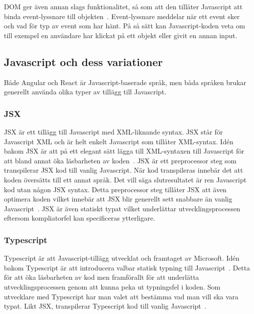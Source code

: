 DOM ger även annan slags funktionalitet, så som att den tillåter Javascript att binda event-lyssnare till objekten~\cite{w3-event}. Event-lyssnare meddelar när ett event sker och vad för typ av event som har hänt. På så sätt kan Javascript-koden veta om till exempel en användare har klickat på ett objekt eller givit en annan input.


\subsection{Javascript och dess variationer}
Både Angular och React är Javascript-baserade språk, men båda språken brukar generellt använda olika typer av tillägg till Javascript.

\subsubsection{JSX}
JSX är ett tillägg till Javascript med XML-liknande syntax. JSX står för Javascript XML och är helt enkelt Javascript som tillåter XML-syntax. Idén bakom JSX är att på ett elegant sätt lägga till XML-syntaxen till Javascript för att bland annat öka läsbarheten av koden~\cite{react-jsx}. JSX är ett preprocessor steg som transpilerar JSX kod till vanlig Javascript. När kod transpileras innebär det att koden översätts till ett annat språk. Det vill säga slutresultatet är ren Javascript kod utan någon JSX syntax. Detta preprocessor steg tillåter JSX att även optimera koden vilket innebär att JSX blir generellt sett snabbare än vanlig Javascript~\cite{jsx, facebook-jsx}. JSX är även statiskt typat vilket underlättar utvecklingsprocessen eftersom kompliatorfel kan specificeras ytterligare.


\subsubsection{Typescript}
Typescript är att Javascript-tillägg utvecklat och framtaget av Microsoft. Idén bakom Typescript är att introducera valbar statisk typning till Javascript~\cite{typescript}. Detta för att öka läsbarheten av kod men framförallt för att underlätta utvecklingsprocessen genom att kunna peka ut typningsfel i koden. Som utvecklare med Typescript har man valet att bestämma vad man vill ska vara typat. Likt JSX, transpilerar Typescript kod till vanlig Javascript~\cite{typescript-book}.

